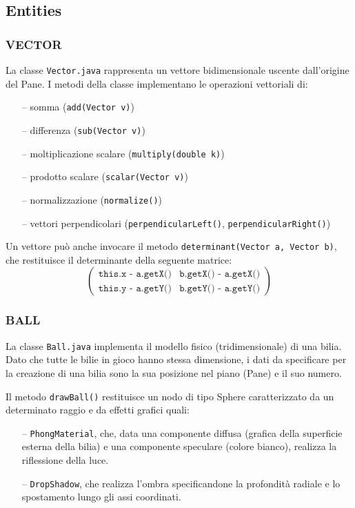 \documentclass[12pt,a4paper]{report}
\begin{document}
\subsection{Entities}\label{se:Entities} %

\subsubsection*{VECTOR}
La classe \texttt{Vector.java} rappresenta un vettore bidimensionale uscente dall'origine del Pane.
I metodi della classe implementano le operazioni vettoriali di:
\begin{itemize}
	\item [--] somma (\texttt{add(Vector v)})
	\item [--] differenza (\texttt{sub(Vector v)})
	\item [--] moltiplicazione scalare (\texttt{multiply(double k)})
	\item [--] prodotto scalare (\texttt{scalar(Vector v)})
	\item [--] normalizzazione (\texttt{normalize()})
	\item [--] vettori perpendicolari (\texttt{perpendicularLeft()}, \texttt{perpendicularRight()}) 
\end{itemize}
Un vettore può anche invocare il metodo \texttt{determinant(Vector a, Vector b)}, che restituisce il determinante della seguente matrice:
\[
\begin{pmatrix}
\texttt{this.x - a.getX()} & \texttt{b.getX() - a.getX()}\\
\texttt{this.y - a.getY()} & \texttt{b.getY() - a.getY()}
\end{pmatrix}
\]

\vspace{3mm}

\subsubsection*{BALL}
La classe \texttt{Ball.java} implementa il modello fisico (tridimensionale) di una bilia.
Dato che tutte le bilie in gioco hanno stessa dimensione, i dati da specificare per la creazione di una bilia sono la sua posizione nel piano (Pane) e il suo numero.

\vspace{3mm}

Il metodo \texttt{drawBall()} restituisce un nodo di tipo Sphere caratterizzato da un determinato raggio e da effetti grafici quali:
\begin{itemize}
	\item [--] \texttt{PhongMaterial}\cite{PhongMaterial}, che, data una componente diffusa (grafica della superficie esterna della bilia) e una componente speculare (colore bianco), realizza la riflessione della luce.
	\item [--] \texttt{DropShadow}\cite{DropShadow}, che realizza l'ombra specificandone la profondità radiale e lo spostamento lungo gli assi coordinati.
\end{itemize}
\end{document}
